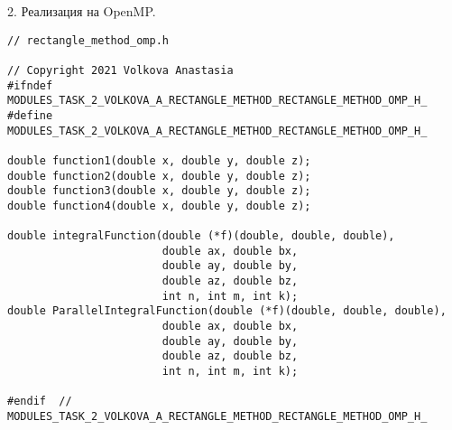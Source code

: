 \documentclass{report}
\begin{document}
\par 2. Реализация на OpenMP.
\begin{lstlisting}
// rectangle_method_omp.h

// Copyright 2021 Volkova Anastasia
#ifndef MODULES_TASK_2_VOLKOVA_A_RECTANGLE_METHOD_RECTANGLE_METHOD_OMP_H_
#define MODULES_TASK_2_VOLKOVA_A_RECTANGLE_METHOD_RECTANGLE_METHOD_OMP_H_

double function1(double x, double y, double z);
double function2(double x, double y, double z);
double function3(double x, double y, double z);
double function4(double x, double y, double z);

double integralFunction(double (*f)(double, double, double),
                        double ax, double bx,
                        double ay, double by,
                        double az, double bz,
                        int n, int m, int k);
double ParallelIntegralFunction(double (*f)(double, double, double),
                        double ax, double bx,
                        double ay, double by,
                        double az, double bz,
                        int n, int m, int k);

#endif  // MODULES_TASK_2_VOLKOVA_A_RECTANGLE_METHOD_RECTANGLE_METHOD_OMP_H_

\end{lstlisting}
\end{document}
